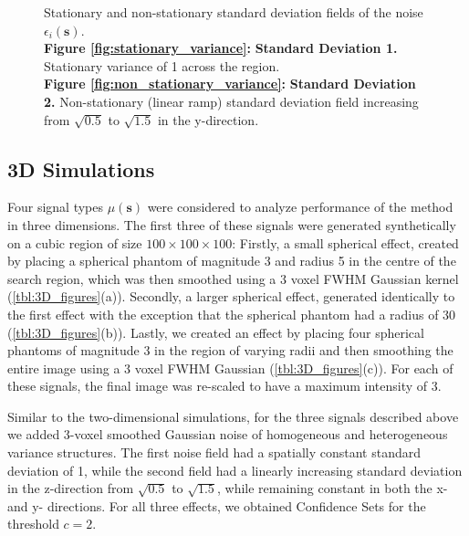 \begin{figure}[htbp]
\label{fig:2D_variances}
\centering
{}
\caption{Stationary and non-stationary standard deviation fields of the noise $\epsilon_{i}(\bm{s})$. \\ \textbf{Figure \ref{fig:stationary_variance}:} \textbf{Standard Deviation 1.} Stationary variance of 1 across the region. \\ \textbf{Figure \ref{fig:non_stationary_variance}:} \textbf{Standard Deviation 2.} Non-stationary (linear ramp) standard deviation field increasing from $\sqrt{0.5}$ to $\sqrt{1.5}$ in the y-direction.}
\end{figure}

\subsection{3D Simulations}
\label{sec:3D_simulations}

Four signal types $\mu(\bm{s})$ were considered to analyze performance of the method in three dimensions. The first three of these signals were generated synthetically on a cubic region of size $100 \times 100 \times 100$: Firstly, a small spherical effect, created by placing a spherical phantom of magnitude 3 and radius 5 in the centre of the search region, which was then smoothed using a 3 voxel FWHM Gaussian kernel (\ref{tbl:3D_figures}(a)). Secondly, a larger spherical effect, generated identically to the first effect with the exception that the spherical phantom had a radius of 30 (\ref{tbl:3D_figures}(b)). Lastly, we created an effect by placing four spherical phantoms of magnitude 3 in the region of varying radii and then smoothing the entire image using a 3 voxel FWHM Gaussian (\ref{tbl:3D_figures}(c)). For each of these signals, the final image was re-scaled to have a maximum intensity of 3.

Similar to the two-dimensional simulations, for the three signals described above we added 3-voxel smoothed Gaussian noise of homogeneous and heterogeneous variance structures. The first noise field had a spatially constant standard deviation of 1, while the second field had a linearly increasing standard deviation in the z-direction from $\sqrt{0.5}$ to $\sqrt{1.5}$, while remaining constant in both the x- and y- directions. For all three effects, we obtained Confidence Sets for the threshold $c = 2$. 

